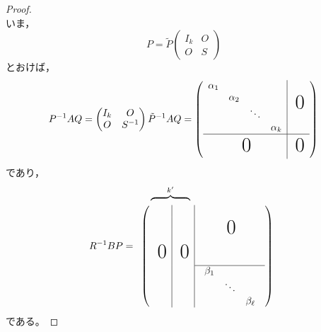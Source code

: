 \documentclass[uplatex]{jsarticle}
\begin{document}
\begin{proof}
\begin{equation}
  \end{equation}
  いま，
  \begin{equation*}
    P = \tilde{P} \begin{pmatrix}
      I_{k} & O \\ O & S
    \end{pmatrix}
  \end{equation*}
  とおけば，
  \begin{equation}
    P^{-1} A Q = \begin{pmatrix}
      I_{k} & O \\ O & S^{-1}
    \end{pmatrix}
    \tilde{P}^{-1} A Q =
    \left( \begin{array}{cccc|c}
      \alpha_{1} &            &        &            & \multirow{4}{*}{\BigZero} \\
                 & \alpha_{2} &        &            & \\
                 &            & \ddots &            & \\
                 &            &        & \alpha_{k} & \\ \hline
      \multicolumn{4}{c|}{\BigZero} & \BigZero
    \end{array} \right) 
  \end{equation}
  であり，
  \begin{equation}
    R^{-1} B P = \begin{array}{l}
      \hspace{1em}\overbrace{\hspace{4em}}^{k'} \\
      \left( \begin{array}{c|c|c}
                &          & \multirow{4}{*}{\BigZero} \\
                &          &                           \\
                &          &                           \\
        \BigZero & \BigZero &                           \\ \cline{3-3}
                &          & \begin{array}{ccc} \beta_{1} & & \\ & \ddots & \\ & & \beta_{\ell} \end{array} \\
      \end{array} \right)
    \end{array}
  \end{equation}
  である。
\end{proof}
\end{document}
